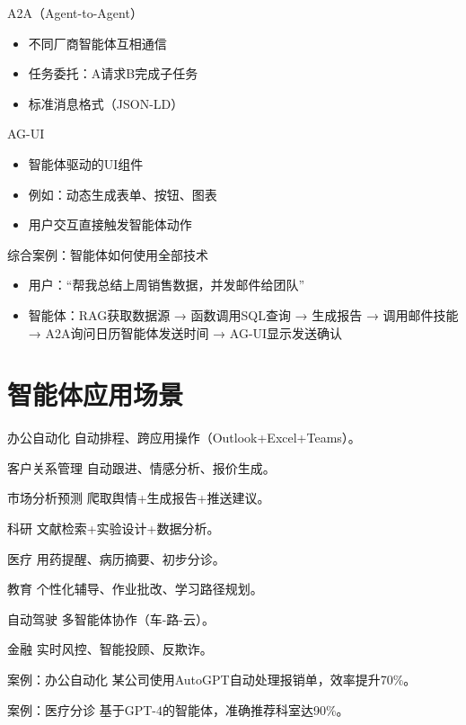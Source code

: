 \begin{frame}{A2A（Agent-to-Agent）}
\begin{itemize}
\item 不同厂商智能体互相通信
\item 任务委托：A请求B完成子任务
\item 标准消息格式（JSON-LD）
\end{itemize}
\end{frame}
\begin{frame}{AG-UI}
\begin{itemize}
\item 智能体驱动的UI组件
\item 例如：动态生成表单、按钮、图表
\item 用户交互直接触发智能体动作
\end{itemize}
\end{frame}
\begin{frame}{综合案例：智能体如何使用全部技术}
\begin{itemize}
\item 用户：“帮我总结上周销售数据，并发邮件给团队”
\item 智能体：RAG获取数据源 → 函数调用SQL查询 → 生成报告 → 调用邮件技能 → A2A询问日历智能体发送时间 → AG-UI显示发送确认
\end{itemize}
\end{frame}

\section{智能体应用场景}

\begin{frame}{办公自动化}
自动排程、跨应用操作（Outlook+Excel+Teams）。
\end{frame}
\begin{frame}{客户关系管理}
自动跟进、情感分析、报价生成。
\end{frame}
\begin{frame}{市场分析预测}
爬取舆情+生成报告+推送建议。
\end{frame}
\begin{frame}{科研}
文献检索+实验设计+数据分析。
\end{frame}
\begin{frame}{医疗}
用药提醒、病历摘要、初步分诊。
\end{frame}
\begin{frame}{教育}
个性化辅导、作业批改、学习路径规划。
\end{frame}
\begin{frame}{自动驾驶}
多智能体协作（车-路-云）。
\end{frame}
\begin{frame}{金融}
实时风控、智能投顾、反欺诈。
\end{frame}
\begin{frame}{案例：办公自动化}
某公司使用AutoGPT自动处理报销单，效率提升70\%。
\end{frame}
\begin{frame}{案例：医疗分诊}
基于GPT-4的智能体，准确推荐科室达90\%。
\end{frame}

